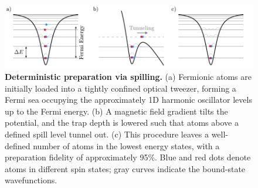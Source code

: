 \newpage

\begin{figure}[h!]
    \centering
    \includegraphics{fig-ai/preparation.pdf}
    \caption{
        \textbf{Deterministic preparation via spilling.}
        (a) Fermionic atoms are initially loaded into a tightly confined optical tweezer, forming a Fermi sea occupying the approximately 1D harmonic oscillator levels up to the Fermi energy. 
        (b) A magnetic field gradient tilts the potential, and the trap depth is lowered such that atoms above a defined spill level tunnel out. 
        (c) This procedure leaves a well-defined number of atoms in the lowest energy states, with a preparation fidelity of approximately 95\%. 
        Blue and red dots denote atoms in different spin states; gray curves indicate the bound-state wavefunctions.
    }
    \label{fig:preparation}
\end{figure}


